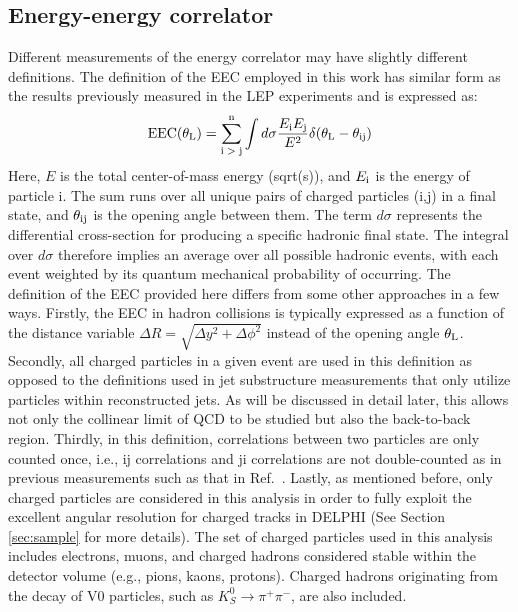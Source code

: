 \documentclass[a4paper,11pt]{article}
\begin{document}
\subsection{Energy-energy correlator}\label{sec:eec}
Different measurements of the energy correlator may have slightly different definitions. The definition of the EEC employed in this work has similar form as the results previously measured in the LEP experiments and is expressed as:
\begin{equation}\label{eq:ENC}
    \text{EEC}(\theta_{\rm L}) = \sum^{\rm n}_{\rm i \; > \; j} \int d\sigma \frac{E_{\rm i}E_{\rm j}}{E^{2}}\delta(\theta_{\rm L} - \theta_{\rm i j})
\end{equation}
Here, $E$ is the total center-of-mass energy (sqrt(s)), and $E_{\rm i}$ is the energy of particle i. The sum runs over all unique pairs of charged particles (i,j) in a final state, and $\theta_{\rm ij}$ is the opening angle between them.
The term $d\sigma$ represents the differential cross-section for producing a specific hadronic final state. The integral over $d\sigma$ therefore implies an average over all possible hadronic events, with each event weighted by its quantum mechanical probability of occurring.
 The definition of the EEC provided here differs from some other approaches in a few ways. Firstly, the EEC in hadron collisions is typically expressed as a function of the distance variable $\Delta R = \sqrt{\Delta y^{2} + \Delta\phi^{2}}$ instead of the opening angle $\theta_{\rm L}$. Secondly, all charged particles in a given event are used in this definition as opposed to the definitions used in jet substructure measurements that only utilize particles within reconstructed jets. As will be discussed in detail later, this allows not only the collinear limit of QCD to be studied but also the back-to-back region. Thirdly, in this definition, correlations between two particles are only counted once, i.e., ij correlations and ji correlations are not double-counted as in previous measurements such as that in Ref.~\cite{OPAL:1990reb}. Lastly, as mentioned before, only charged particles are considered in this analysis in order to fully exploit the excellent angular resolution for charged tracks in DELPHI (See Section \ref{sec:sample} for more details). The set of charged particles used in this analysis includes electrons, muons, and charged hadrons considered stable within the detector volume (e.g., pions, kaons, protons). Charged hadrons originating from the decay of V0 particles, such as $K^0_S \to \pi^+\pi^-$, are also included. 
\end{document}

